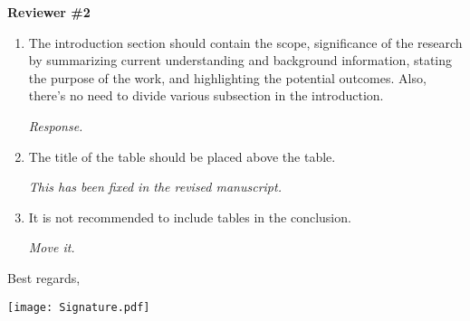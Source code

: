 \documentclass[12pt]{casletter}
\begin{document}
\begin{letter}
\begin{enumerate}
  \end{enumerate}

  \textbf{Reviewer \#2}

  \begin{enumerate}
  
  \item The introduction section should contain the scope, significance of the
  research by summarizing current understanding and background information,
  stating the purpose of the work, and highlighting the potential outcomes.
  Also, there's no need to divide various subsection in the introduction.
  \medskip

  \emph{Response.\smallskip}

  \item The title of the table should be placed above the table. \medskip

  \emph{This has been fixed in the revised manuscript.  \smallskip}

  \item It is not recommended to include tables in the conclusion. \medskip

  \emph{Move it.  \smallskip}

  \end{enumerate}

  \closing{Best regards,~\newline} \vspace{-29mm}
  \texttt{[image: Signature.pdf]}

\end {letter}
\end{document}
